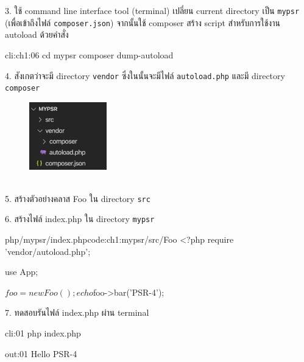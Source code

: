 3. ใช้ command line interface tool (terminal) เปลี่ยน current directory เป็น \texttt{mypsr}
(เพื่อเข้าถึงไฟล์ \texttt{composer.json}) จากนั้นใช้ composer สร้าง script สำหรับการใช้งาน autoload ด้วยคำสั่ง
\begin{cli}{cli:ch1:06}
    cd mypsr
    composer dump-autoload
\end{cli}

\newpage

4. สังเกตว่าจะมี directory \texttt{vendor} ซึ่งในนั้นจะมีไฟล์ \texttt{autoload.php}
และมี directory \texttt{composer}
\begin{figure}[h!]
    \centering
    \includegraphics[width=0.3\textwidth]{images/ch1/02.png}
    \label{fig:ch1.2-mypsr-folder}
\end{figure}\\

5. สร้างตัวอย่างคลาส Foo ใน directory \texttt{src}


6. สร้างไฟล์ index.php ใน directory \texttt{mypsr}
\begin{code}{php}{/mypsr/index.php}{code:ch1:mypsr/src/Foo}
    <?php
    require 'vendor/autoload.php';

    use App\Foo;

    $foo = new Foo();
    echo $foo->bar('PSR-4');

\end{code}

\newpage

7. ทดสอบรันไฟล์ index.php ผ่าน terminal

\begin{cli}{cli:01}
    php index.php
\end{cli}

\begin{out}{out:01}
    Hello PSR-4
\end{out}

